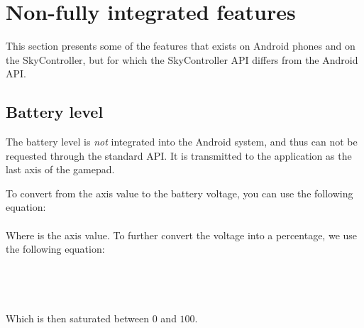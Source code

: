 \section{Non-fully integrated features}

This section presents some of the features that exists on Android phones and on the SkyController, but for which the SkyController API differs from the Android API.

\subsection{Battery level}

The battery level is \emph{not} integrated into the Android system, and thus can not be requested through the standard API. It is transmitted to the application as the last axis of the gamepad.

To convert from the axis value to the battery voltage, you can use the following equation:\\
\\
Where  is the axis value. To further convert the voltage into a percentage, we use the following equation:\\
\\
\\
\\
 \\
Which is then saturated between $0$ and $100$.

